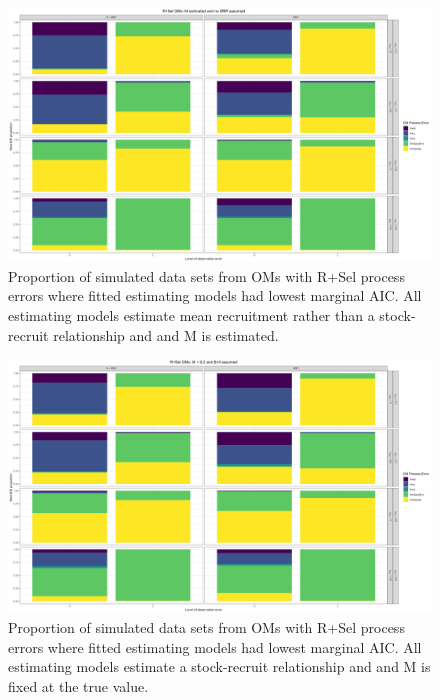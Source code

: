 \documentclass[
  12pt,
]{article}
\begin{document}
\begin{landscape}
\begin{figure}
\caption{Proportion of simulated data sets from OMs with R+Sel process errors where fitted estimating models had lowest marginal AIC. All estimating models estimate mean recruitment rather than a stock-recruit relationship and and M is estimated.} \label{Sel_om_proportion_best_aic_R_ME}
\begin{center}
\includegraphics[width = \textwidth]{Sel_om_proportion_best_aic_R_ME.png}
\end{center}
\end{figure}
\end{landscape}

\begin{landscape}
\begin{figure}
\caption{Proportion of simulated data sets from OMs with R+Sel process errors where fitted estimating models had lowest marginal AIC. All estimating models estimate a stock-recruit relationship and and M is fixed at the true value.} \label{Sel_om_proportion_best_aic_SR_MF}
\begin{center}
\includegraphics[width = \textwidth]{Sel_om_proportion_best_aic_SR_MF.png}
\end{center}
\end{figure}
\end{landscape}
\end{document}
